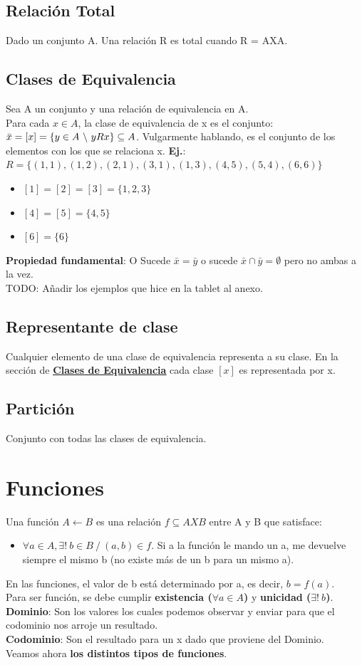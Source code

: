 \documentclass[10pt,a4paper]{article}
\begin{document}
\subsection*{Relación Total}
Dado un conjunto A. Una relación R es total cuando R = AXA.
\subsection*{Clases de Equivalencia}
\label{subsec:clases_equivalencia}
Sea A un conjunto y una relación de equivalencia en A. \\
Para cada $x \in A$, la clase de equivalencia de x es el conjunto: $\bar{x} = [x] = \{y \in A \ \symbol{92} \ yRx\} \subseteq A$. Vulgarmente hablando, es el conjunto de los elementos con los que se relaciona x.
\textbf{Ej.}: $ R = \{(1,1), (1, 2), (2, 1), (3, 1), (1, 3), (4, 5), (5, 4), (6, 6)\}$
\begin{itemize}
    \item $[1] = [2] = [3] =  \{1, 2, 3\}$
    \item $[4] = [5] = \{4, 5\}$
    \item $[6] = \{6\}$
\end{itemize}
\textbf{Propiedad fundamental}: O Sucede $ \bar{x} = \bar{y}$ o sucede $\bar{x} \cap \bar{y} = \emptyset $ pero no ambas a la vez. \\
TODO: Añadir los ejemplos que hice en la tablet al anexo.
\subsection*{Representante de clase}
Cualquier elemento de una clase de equivalencia representa a su clase. 
En la sección de \hyperref[subsec:clases_equivalencia]{\underline{\textbf{Clases de Equivalencia}}} cada clase $[x]$ es representada por x. 
\subsection*{Partición}
Conjunto con todas las clases de equivalencia.
\section*{Funciones}
Una función $A \leftarrow B$ es una relación $ f \subseteq AXB$ entre A y B que satisface: 
\begin{itemize}
    \item $\forall a \in A, \exists! \ b \in B \ / \ (a, b) \in f$. Si a la función le mando un a, me devuelve siempre el mismo b (no existe más de un b para un mismo a).
\end{itemize}
En las funciones, el valor de b está determinado por a, es decir, $b = f(a)$. \\
Para ser función, se debe cumplir \textbf{existencia ($\forall a \in A$)} y \textbf{unicidad ($\exists! \ b $)}. \\
\textbf{Dominio}: Son los valores los cuales podemos observar y enviar para que el codominio nos arroje un resultado. \\
\textbf{Codominio}: Son el resultado para un x dado que proviene del Dominio. \\
Veamos ahora \textbf{los distintos tipos de funciones}.
\end{document}

